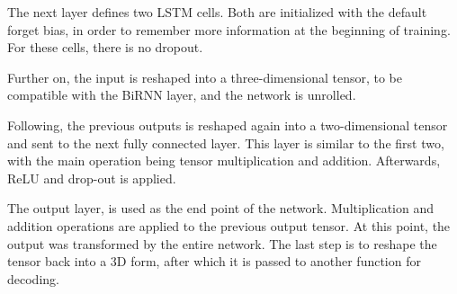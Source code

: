 The next layer defines two LSTM cells. Both are initialized with the default forget bias, in order to remember more information at the beginning of training. For these cells, there is no dropout.

Further on, the input is reshaped into a three-dimensional tensor, to be compatible with the BiRNN layer, and the network is unrolled. 

Following, the previous outputs is reshaped again into a two-dimensional tensor and sent to the next fully connected layer. 
This layer is similar to the first two, with the main operation being tensor multiplication and addition.
Afterwards, ReLU and drop-out is applied.

The output layer, is used as the end point of the network.
Multiplication and addition operations are applied to the previous output tensor. 
At this point, the output was transformed by the entire network. 
The last step is to reshape the tensor back into a 3D form, after which it is passed to another function for decoding.
